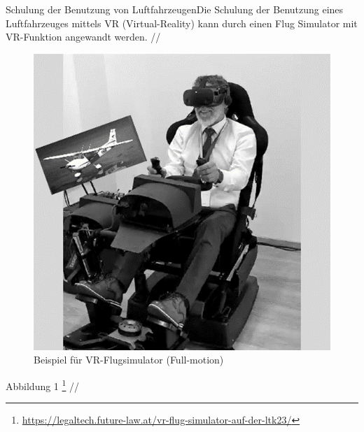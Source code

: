 Schulung der Benutzung von LuftfahrzeugenDie Schulung der Benutzung eines Luftfahrzeuges mittels VR (Virtual-Reality) kann durch einen Flug Simulator mit VR-Funktion angewandt werden.
//
\begin{figure}[!ht]
    \centering
    \includegraphics[width=1.0\textwidth]{images/Abbildung 1.png}
    \caption{\label{fig:Abbildung 1}Beispiel für VR-Flugsimulator (Full-motion)\protect
    }
\end{figure}
Abbildung 1 \footnote{\url{https://legaltech.future-law.at/vr-flug-simulator-auf-der-ltk23/}}
//
